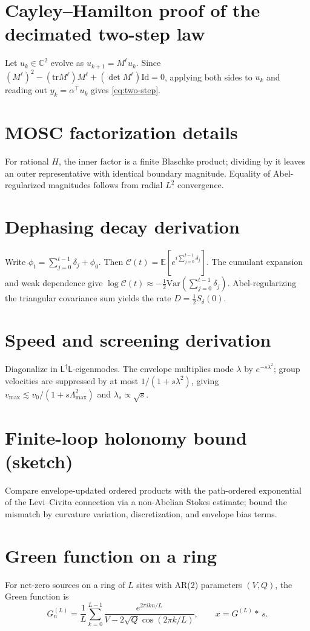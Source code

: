 \documentclass[12pt]{article}
\theoremstyle{definition}
\newcommand{\C}{\mathbb{C}}
\newcommand{\E}{\mathbb{E}}
\newcommand{\Var}{\mathrm{Var}}
\newcommand{\Id}{\mathrm{Id}}
\newcommand{\tr}{\mathrm{tr}}
\begin{document}
\appendix

\section{Cayley--Hamilton proof of the decimated two-step law}
Let $u_k\in\C^2$ evolve as $u_{k+1}=M^\ell u_k$. Since $(M^\ell)^2-(\tr M^\ell)M^\ell+(\det M^\ell)\Id=0$, applying both sides to $u_k$ and reading out $y_k=\alpha^\top u_k$ gives \eqref{eq:two-step}.

\section{MOSC factorization details}
For rational $H$, the inner factor is a finite Blaschke product; dividing by it leaves an outer representative with identical boundary magnitude. Equality of Abel-regularized magnitudes follows from radial $L^2$ convergence.

\section{Dephasing decay derivation}
Write $\phi_t=\sum_{j=0}^{t-1}\delta_j+\phi_0$. Then $\mathcal C(t)=\E[e^{i\sum_{j=0}^{t-1}\delta_j}]$. The cumulant expansion and weak dependence give $\log \mathcal C(t)\approx -\tfrac12 \Var(\sum_{j=0}^{t-1}\delta_j)$. Abel-regularizing the triangular covariance sum yields the rate $D=\tfrac12 S_\delta(0)$.

\section{Speed and screening derivation}
Diagonalize in $\mathsf L^\dagger\mathsf L$-eigenmodes. The envelope multiplies mode $\lambda$ by $e^{-s\lambda^2}$; group velocities are suppressed by at most $1/(1+s\lambda^2)$, giving $v_{\max}\lesssim v_0/(1+s\Lambda_{\max}^2)$ and $\lambda_s\propto\sqrt{s}$.

\section{Finite-loop holonomy bound (sketch)}
Compare envelope-updated ordered products with the path-ordered exponential of the Levi--Civita connection via a non-Abelian Stokes estimate; bound the mismatch by curvature variation, discretization, and envelope bias terms.

\section{Green function on a ring}
For net-zero sources on a ring of $L$ sites with AR(2) parameters $(V,Q)$, the Green function is
\begin{equation}
G^{(L)}_n=\frac{1}{L}\sum_{k=0}^{L-1}\frac{e^{2\pi i k n/L}}{V-2\sqrt{Q}\cos(2\pi k/L)},\qquad x=G^{(L)}\!*\,s.
\end{equation}
\end{document}
